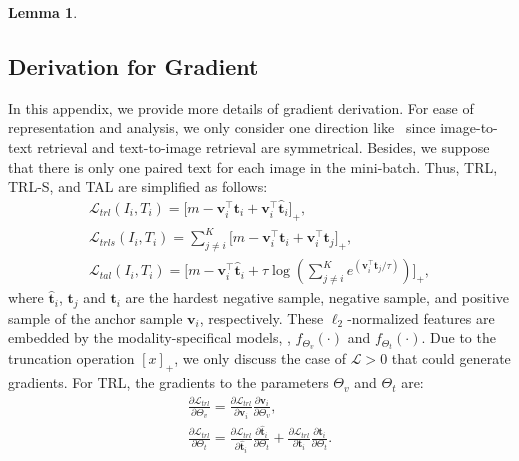 \documentclass[10pt,twocolumn,letterpaper]{article}
\newtheorem{lemma}{Lemma}
\begin{document}
\begin{lemma}
\end{lemma}

\subsection{Derivation for Gradient}
In this appendix, we provide more details of gradient derivation. For ease of representation and analysis, we only consider one direction like~\cite{li2023selectively} since image-to-text retrieval and text-to-image retrieval are symmetrical. Besides, we suppose that there is only one paired text for each image in the mini-batch. Thus, TRL, TRL-S, and TAL are simplified as follows:
 \begin{equation}
     \begin{gathered}
        \mathcal{L}_{trl}(I_i,T_i)= \big[ m- \boldsymbol{v}_i^\top\boldsymbol{t}_i  + \boldsymbol{v}_i^\top\hat{\boldsymbol{t}}_i \big]_+,\\
         \mathcal{L}_{trls}(I_i,T_i)= \sum^K_{j\neq i} \big[ m- \boldsymbol{v}_i^\top\boldsymbol{t}_i  + \boldsymbol{v}_i^\top{\boldsymbol{t}}_j  \big]_+,\\
         \mathcal{L}_{tal}(I_i,T_i)= \Big[ m- \boldsymbol{v}_i^\top\hat{\boldsymbol{t}}_i +\tau\log(\sum^K_{j\neq i}e^{(\boldsymbol{v}_i^\top{\boldsymbol{t}}_j/\tau)})\Big]_+,
     \end{gathered}
 \end{equation}
where $\hat{\boldsymbol{t}}_i$, $\boldsymbol{t}_j$ and $\boldsymbol{t}_i$ are the hardest negative sample, negative sample, and positive sample of the anchor sample $\boldsymbol{v}_i$, respectively. These $\ell_2$-normalized features are embedded by the modality-specifical models, \ie, $f_{\Theta_{v}}(\cdot)$ and $f_{\Theta_{t}}(\cdot)$. Due to the truncation operation $[x]_+$, we only discuss the case of $\mathcal{L} > 0$ that could generate gradients. For TRL, the gradients to the parameters $\Theta_v$ and $\Theta_t$ are:
\begin{equation}
    \begin{gathered}
        \frac{\partial\mathcal{L}_{trl}}{\partial\Theta_v}=\frac{\partial\mathcal{L}_{trl}}{\partial\boldsymbol{v}_i}\frac{\partial\boldsymbol{v}_i}{\partial\Theta_v},\\
        \frac{\partial\mathcal{L}_{trl}}{\partial\Theta_t}=\frac{\partial\mathcal{L}_{trl}}{\partial\hat{\boldsymbol{t}}_i}\frac{\partial\hat{\boldsymbol{t}}_i}{\partial\Theta_t}+\frac{\partial\mathcal{L}_{trl}}{\partial{\boldsymbol{t}}_i}\frac{\partial{\boldsymbol{t}}_i}{\partial\Theta_t}.
    \end{gathered}
\end{equation}
\end{document}
